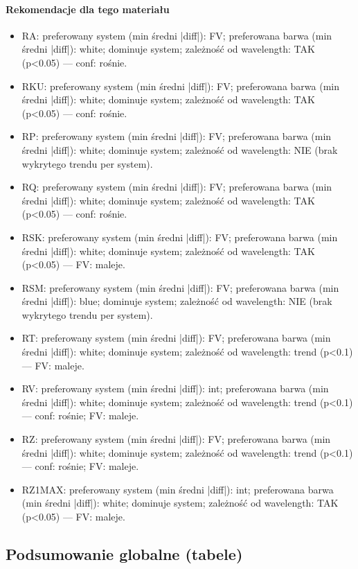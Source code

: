 \documentclass[
  10pt,
]{article}
\begin{document}
\paragraph{Rekomendacje dla tego materiału}
\begin{itemize}
\item RA: preferowany system (min średni |diff|): FV; preferowana barwa (min średni |diff|): white; dominuje system; zależność od wavelength: TAK (p<0.05) — conf: rośnie.
\item RKU: preferowany system (min średni |diff|): FV; preferowana barwa (min średni |diff|): white; dominuje system; zależność od wavelength: TAK (p<0.05) — conf: rośnie.
\item RP: preferowany system (min średni |diff|): FV; preferowana barwa (min średni |diff|): white; dominuje system; zależność od wavelength: NIE (brak wykrytego trendu per system).
\item RQ: preferowany system (min średni |diff|): FV; preferowana barwa (min średni |diff|): white; dominuje system; zależność od wavelength: TAK (p<0.05) — conf: rośnie.
\item RSK: preferowany system (min średni |diff|): FV; preferowana barwa (min średni |diff|): white; dominuje system; zależność od wavelength: TAK (p<0.05) — FV: maleje.
\item RSM: preferowany system (min średni |diff|): FV; preferowana barwa (min średni |diff|): blue; dominuje system; zależność od wavelength: NIE (brak wykrytego trendu per system).
\item RT: preferowany system (min średni |diff|): FV; preferowana barwa (min średni |diff|): white; dominuje system; zależność od wavelength: trend (p<0.1) — FV: maleje.
\item RV: preferowany system (min średni |diff|): int; preferowana barwa (min średni |diff|): white; dominuje system; zależność od wavelength: trend (p<0.1) — conf: rośnie; FV: maleje.
\item RZ: preferowany system (min średni |diff|): FV; preferowana barwa (min średni |diff|): white; dominuje system; zależność od wavelength: trend (p<0.1) — conf: rośnie; FV: maleje.
\item RZ1MAX: preferowany system (min średni |diff|): int; preferowana barwa (min średni |diff|): white; dominuje system; zależność od wavelength: TAK (p<0.05) — FV: maleje.
\end{itemize}

\subsection{Podsumowanie globalne
(tabele)}\label{podsumowanie-globalne-tabele}
\end{document}
